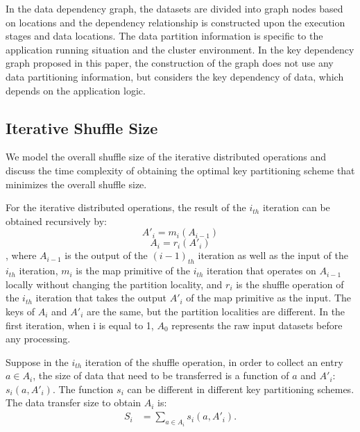 \documentclass[10pt,journal,compsoc]{IEEEtran}
\begin{document}
In the data dependency graph, the datasets are divided into graph nodes
based on locations and the dependency relationship is
constructed upon the execution stages and data locations.
The data partition information is specific to the application running
situation and the cluster environment.
In the key dependency graph proposed in this paper, the construction of
the graph does not use any data partitioning information, but considers
the key dependency of data, which depends on the
application logic.

\subsection{Iterative Shuffle Size}\label{section:model}
We model the overall shuffle size of the iterative
distributed operations and discuss the time complexity of obtaining
the optimal key partitioning scheme that minimizes the overall shuffle
size.



For the iterative distributed operations, the result of the $i_{th}$ iteration can be obtained recursively by:
\begin{equation}\label{eq:m}
A'_i=m_i(A_{i-1})
\end{equation}
\begin{equation}\label{eq:r}
A_i=r_i(A'_i)
\end{equation}
, where $A_{i-1}$ is the output of the $(i-1)_{th}$ iteration as well as the input of the $i_{th}$ iteration, 
$m_i$ is the map primitive of the $i_{th}$ iteration that operates on $A_{i-1}$ locally without changing the partition locality, 
and $r_i$ is the shuffle operation of the $i_{th}$ iteration that takes the output $A'_i$ of the map primitive as the input.  
The keys of $A_i$ and $A'_i$ are the same, but the partition localities are different. 
In the first iteration, when i is equal to 1, 
$A_0$ represents the raw input datasets before any processing.  

Suppose in the $i_{th}$ iteration of the shuffle operation, in order to collect an entry $a \in A_i$, 
the size of data that need to be transferred is a function of $a$ and $A'_i$: $s_i(a,A'_i)$. The function $s_i$ can be different in different key partitioning schemes. 
The data transfer size to obtain $A_i$ is: 
\begin{equation}\label{eq:si}
\begin{aligned}
S_i&=\sum_{a \in A_i} s_i(a,A'_i).
\end{aligned}
\end{equation}
\end{document}
